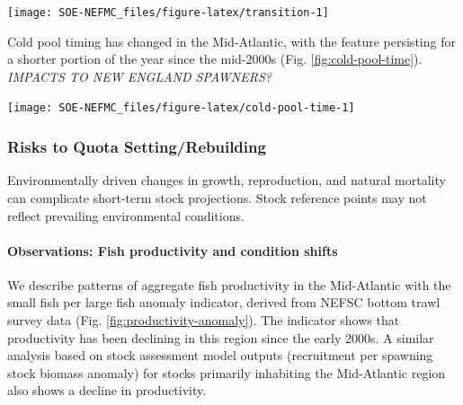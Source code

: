 \documentclass[
  10pt,
]{article}
\let\origfigure\figure
\let\endorigfigure\endfigure
\renewenvironment{figure}[1][2] {
    \expandafter\origfigure\expandafter[H]
} {
    \endorigfigure
}
\begin{document}
\begin{figure}

{\centering \texttt{[image: SOE-NEFMC\_files/figure-latex/transition-1]} 

}

\caption{Ocean summer length in the MAB: the annual total number of days between the spring thermal transition date and the fall thermal transition date.  The transition dates are defined as the day of the year when surface temperatures changeover from cool to warm conditions in the spring and back to cool conditions in the fall.}\label{fig:transition}
\end{figure}

Cold pool timing has changed in the Mid-Atlantic, with the feature persisting for a shorter portion of the year since the mid-2000s (Fig. \ref{fig:cold-pool-time}). \emph{IMPACTS TO NEW ENGLAND SPAWNERS?}

\begin{figure}

{\centering \texttt{[image: SOE-NEFMC\_files/figure-latex/cold-pool-time-1]} 

}

\caption{Seasonal cold pool indices: mean temperature within the cold pool, cold pool persistence, and spatial extent.}\label{fig:cold-pool-time}
\end{figure}

\hypertarget{risks-to-quota-settingrebuilding}{%
\subsubsection{Risks to Quota Setting/Rebuilding}\label{risks-to-quota-settingrebuilding}}

Environmentally driven changes in growth, reproduction, and natural mortality can complicate short-term stock projections. Stock reference points may not reflect prevailing environmental conditions.

\hypertarget{observations-fish-productivity-and-condition-shifts}{%
\paragraph{Observations: Fish productivity and condition shifts}\label{observations-fish-productivity-and-condition-shifts}}

We describe patterns of aggregate fish productivity in the Mid-Atlantic with the small fish per large fish anomaly indicator, derived from NEFSC bottom trawl survey data (Fig. \ref{fig:productivity-anomaly}). The indicator shows that productivity has been declining in this region since the early 2000s. A similar analysis based on stock assessment model outputs (recruitment per spawning stock biomass anomaly) for stocks primarily inhabiting the Mid-Atlantic region also shows a decline in productivity.
\end{document}
